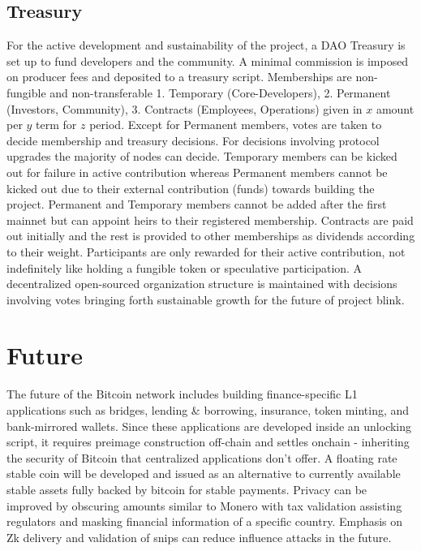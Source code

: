 \documentclass[a4paper,10pt]{article}
\begin{document}
\subsection{Treasury}

For the active development and sustainability of the project, a DAO Treasury is set up to fund developers and the community. A minimal commission is imposed on producer fees and deposited to a treasury script. Memberships are non-fungible and non-transferable 1. Temporary (Core-Developers), 2. Permanent (Investors, Community), 3. Contracts (Employees, Operations) given in $x$ amount per $y$ term for $z$ period. Except for Permanent members, votes are taken to decide membership and treasury decisions. For decisions involving protocol upgrades the majority of nodes can decide. Temporary members can be kicked out for failure in active contribution whereas Permanent members cannot be kicked out due to their external contribution (funds) towards building the project. Permanent and Temporary members cannot be added after the first mainnet but can appoint heirs to their registered membership. Contracts are paid out initially and the rest is provided to other memberships as dividends according to their weight. Participants are only rewarded for their active contribution, not indefinitely like holding a fungible token or speculative participation. A decentralized open-sourced organization structure is maintained with decisions involving votes bringing forth sustainable growth for the future of project blink.

\section{Future}

The future of the Bitcoin network includes building finance-specific L1 applications such as bridges, lending \& borrowing, insurance, token minting, and bank-mirrored wallets. Since these applications are developed inside an unlocking script, it requires preimage construction off-chain and settles onchain - inheriting the security of Bitcoin that centralized applications don't offer. A floating rate stable coin \cite{stablecoin} will be developed and issued as an alternative to currently available stable assets fully backed by bitcoin for stable payments. Privacy can be improved by obscuring amounts similar to Monero with tax validation assisting regulators and masking financial information of a specific country. Emphasis on Zk delivery and validation of snips can reduce influence attacks in the future. 
\end{document}
